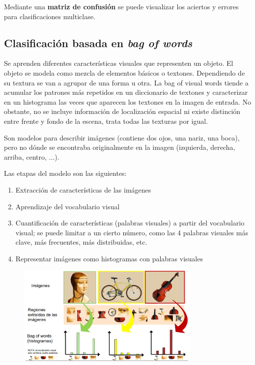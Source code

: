 Mediante una \textbf{matriz de confusión} se puede visualizar los aciertos y errores para clasificaciones multiclase.

\subsection{Clasificación basada en \textit{bag of words}}
Se aprenden diferentes características visuales que representen un objeto. El objeto se modela como mezcla de elementos básicos o textones. Dependiendo de su textura se van a agrupar de una forma u otra. La bag of visual words tiende a acumular los patrones más repetidos en un diccionario de textones y caracterizar en un histograma las veces que aparecen los textones en la imagen de entrada. No obstante, no se incluye información de localización espacial ni existe distinción entre frente y fondo de la escena, trata todas las texturas por igual. 

Son modelos para describir imágenes (contiene dos ojos, una nariz, una boca), pero no dónde se encontraba originalmente en la imagen (izquierda, derecha, arriba, centro, ...).

Las etapas del modelo son las siguientes:
\begin{enumerate}
\item Extracción de características de las imágenes
\item Aprendizaje del vocabulario visual
\item Cuantificación de características (palabras visuales) a partir del vocabulario visual; se puede limitar a un cierto número, como las 4 palabras visuales más clave, más frecuentes, más distribuidas, etc.
\item Representar imágenes como histogramas con palabras visuales
\end{enumerate}

\begin{figure}[h]
\centering
\includegraphics[width = 0.8\textwidth]{figs/bag-of-words.png}
\end{figure}

